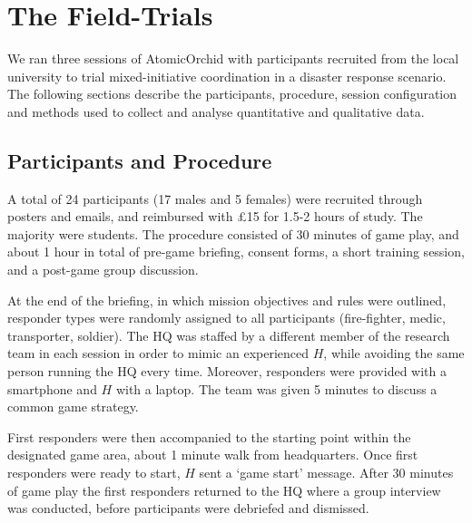 \section{The Field-Trials}\label{sec:evaluation}
\noindent We ran three sessions of AtomicOrchid with participants recruited from the local university to trial mixed-initiative coordination in a disaster response scenario. The following sections describe the participants, procedure, session configuration and methods used to collect and analyse quantitative and qualitative data.

\subsection{Participants and Procedure}
\noindent  A total of 24 participants (17 males and 5 females) were recruited through posters and emails, and reimbursed with \pounds 15  for 1.5-2 hours of study. The majority were students. The procedure consisted of 30 minutes of game play, and about 1 hour in total of pre-game briefing, consent forms,  a short training session, and a post-game group discussion. 


At the end of the briefing, in which mission objectives and rules were outlined, responder types were randomly assigned to all participants (fire-fighter, medic, transporter, soldier). The HQ was staffed by a different member of the research team in each session in order to mimic an experienced $H$, while avoiding the same person running the HQ every time.  Moreover, responders were provided with a smartphone and $H$ with a laptop. The team was given 5 minutes to discuss a common game strategy. 


First responders were then accompanied to the starting point within the designated game area, about 1 minute walk from headquarters. Once first responders were ready to start, $H$ sent a `game start' message. After 30 minutes of game play the first responders returned to the HQ where a group interview was conducted, before participants were debriefed and dismissed.

